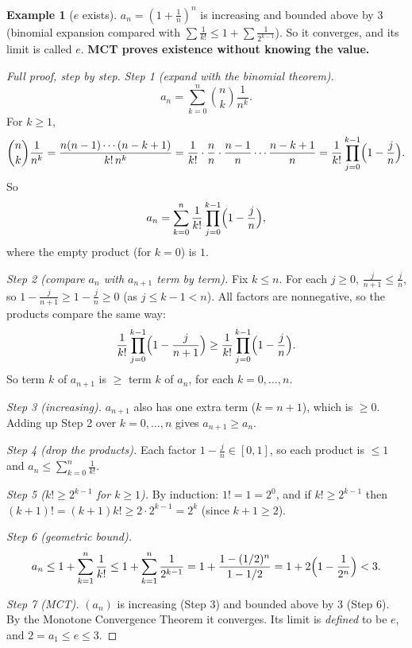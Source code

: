\documentclass[11pt]{article}
\theoremstyle{definition}
\newtheorem{ex}[defn]{Example}
\newcommand{\key}[1]{\textcolor{red!70!black}{\textbf{#1}}}
\begin{document}
\begin{ex}[$e$ exists]
$a_n=\left(1+\frac1n\right)^n$ is increasing and bounded above by $3$
(binomial expansion compared with $\sum\frac1{k!}\le1+\sum\frac1{2^{k-1}}$).
So it converges, and its limit is called $e$. \key{MCT proves existence
without knowing the value.}

\begin{proof}[Full proof, step by step]
\emph{Step 1 (expand with the binomial theorem).}
\[
a_n=\sum_{k=0}^n\binom nk\frac1{n^k}.
\]
For $k\ge1$,
\[
\binom nk\frac1{n^k}=\frac{n(n-1)\cdots(n-k+1)}{k!\,n^k}
=\frac1{k!}\cdot\frac nn\cdot\frac{n-1}n\cdots\frac{n-k+1}n
=\frac1{k!}\prod_{j=0}^{k-1}\Bigl(1-\frac jn\Bigr).
\]
So
\[
a_n=\sum_{k=0}^n\frac1{k!}\prod_{j=0}^{k-1}\Bigl(1-\frac jn\Bigr),
\]
where the empty product (for $k=0$) is $1$.

\emph{Step 2 (compare $a_n$ with $a_{n+1}$ term by term).} Fix $k\le n$.
For each $j\ge0$, $\frac j{n+1}\le\frac jn$, so
$1-\frac j{n+1}\ge1-\frac jn\ge0$ (as $j\le k-1<n$). All factors are
nonnegative, so the products compare the same way:
\[
\frac1{k!}\prod_{j=0}^{k-1}\Bigl(1-\frac j{n+1}\Bigr)
\ge\frac1{k!}\prod_{j=0}^{k-1}\Bigl(1-\frac jn\Bigr).
\]
So term $k$ of $a_{n+1}$ is $\ge$ term $k$ of $a_n$, for each
$k=0,\dots,n$.

\emph{Step 3 (increasing).} $a_{n+1}$ also has one extra term ($k=n+1$),
which is $\ge0$. Adding up Step 2 over $k=0,\dots,n$ gives
$a_{n+1}\ge a_n$.

\emph{Step 4 (drop the products).} Each factor
$1-\frac jn\in[0,1]$, so each product is $\le1$ and
$a_n\le\sum_{k=0}^n\frac1{k!}$.

\emph{Step 5 ($k!\ge2^{k-1}$ for $k\ge1$).} By induction: $1!=1=2^0$, and
if $k!\ge2^{k-1}$ then $(k+1)!=(k+1)k!\ge2\cdot2^{k-1}=2^k$ (since
$k+1\ge2$).

\emph{Step 6 (geometric bound).}
\[
a_n\le1+\sum_{k=1}^n\frac1{k!}\le1+\sum_{k=1}^n\frac1{2^{k-1}}
=1+\frac{1-(1/2)^n}{1-1/2}=1+2\Bigl(1-\frac1{2^n}\Bigr)<3.
\]

\emph{Step 7 (MCT).} $(a_n)$ is increasing (Step 3) and bounded above by
$3$ (Step 6). By the Monotone Convergence Theorem it converges. Its limit
is \emph{defined} to be $e$, and $2=a_1\le e\le3$.
\end{proof}
\end{ex}
\end{document}
